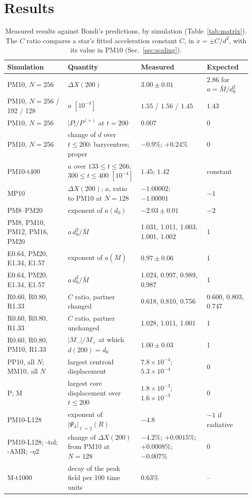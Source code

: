 \documentclass[twocolumn,floatfix,aps,prd,superscriptaddress,nofootinbib]{revtex4-2}
\begin{document}
\section{Results}
\label{sec:results}

\begin{table}[t]
\caption{Measured results against Bondi's predictions, by simulation (Table~\ref{tab:matrix}). The $C$ ratio compares a star's fitted acceleration constant $C$, in $\ddot x=\pm C/d^2$, with its value in PM10 (Sec.~\ref{sec:scaling}).}
\label{tab:results}
\begin{ruledtabular}
\begin{tabular}{lp{}p{}l}
Simulation & Quantity & Measured & Expected \\
\hline
PM10, $N=256$ & $\Delta X(200)$ & $3.00\pm0.01$ & $2.86$ for $a=\bar M/d_0^2$ \\
PM10, $N=256$ / 192 / 128 & $a$ $[10^{-4}]$ & $1.55$ / $1.56$ / $1.45$ & $1.43$ \\
PM10, $N=256$ & $|P|/P^{(+)}$ at $t=200$ & $0.007$ & 0 \\
PM10, $N=256$ & change of $d$ over $t\le200$: barycentres; proper & $-0.9\%$; $+0.24\%$ & 0 \\
PM10-t400 & $a$ over $133\le t\le266$; $300\le t\le400$ $[10^{-4}]$ & $1.45$; $1.42$ & constant \\
MP10 & $\Delta X(200)$; $a$, ratio to PM10 at $N=128$ & $-1.00002$; $-1.00001$ & $-1$ \\
PM8--PM20 & exponent of $a(d_0)$ & $-2.03\pm0.01$ & $-2$ \\
PM8, PM10, PM12, PM16, PM20 & $a\,d_0^2/\bar M$ & 1.031, 1.011, 1.003, 1.001, 1.002 & 1 \\
E0.64, PM20, E1.34, E1.57 & exponent of $a(\bar M)$ & $0.97\pm0.06$ & 1 \\
E0.64, PM20, E1.34, E1.57 & $a\,d_0^2/\bar M$ & 1.024, 0.997, 0.989, 0.987 & 1 \\
R0.60, R0.80, R1.33 & $C$ ratio, partner changed & 0.618, 0.810, 0.756 & 0.600, 0.803, 0.747 \\
R0.60, R0.80, R1.33 & $C$ ratio, partner unchanged & 1.028, 1.011, 1.001 & 1 \\
R0.60, R0.80, PM10, R1.33 & $|M_-|/M_+$ at which $d(200)=d_0$ & $1.00\pm0.03$ & 1 \\
PP10, all $N$; MM10, all $N$ & largest centroid displacement & $7.8\times10^{-4}$; $5.3\times10^{-4}$ & 0 \\
P; M & largest core displacement over $t\le200$ & $1.8\times10^{-3}$; $1.6\times10^{-3}$ & 0 \\
PM10-L128 & exponent of $|\Psi_4|_{\ell=2}(R)$ & $-4.8$ & $-1$ if radiative \\
PM10-L128; -tol; -AMR; -$\eta$2 & change of $\Delta X(200)$ from PM10 at $N=128$ & $-4.2\%$; $+0.0015\%$; $+0.0008\%$; $-0.007\%$ & 0 \\
M-t1000 & decay of the peak field per 100 time units & $0.63\%$ & -- \\
\end{tabular}
\end{ruledtabular}
\end{table}
\end{document}
